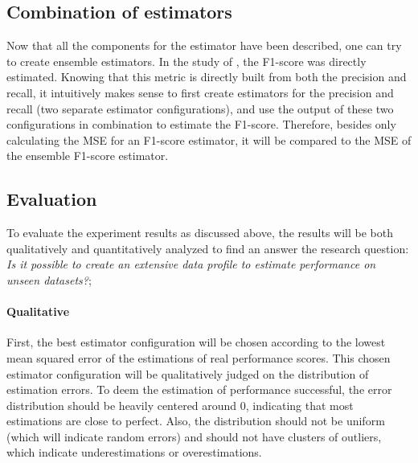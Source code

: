 \subsection{Combination of estimators}
Now that all the components for the estimator have been described, one can try to create ensemble estimators. In the study of \cite{Mahdavi2019-pk}, the F1-score was directly estimated. Knowing that this metric is directly built from both the precision and recall, it intuitively makes sense to first create estimators for the precision and recall (two separate estimator configurations), and use the output of these two configurations in combination to estimate the F1-score. Therefore, besides only calculating the MSE for an F1-score estimator, it will be compared to the MSE of the ensemble F1-score estimator.

\subsection{Evaluation}
\label{subsec:evaluation_performanceprediction}
To evaluate the experiment results as discussed above, the results will be both qualitatively and quantitatively analyzed to find an answer the research question: \textit{Is it possible to create an extensive data profile to estimate performance on unseen datasets?};

\paragraph{Qualitative} First, the best estimator configuration will be chosen according to the lowest mean squared error of the estimations of real performance scores. This chosen estimator configuration will be qualitatively judged on the distribution of estimation errors. To deem the estimation of performance successful, the error distribution should be heavily centered around 0, indicating that most estimations are close to perfect. Also, the distribution should not be uniform (which will indicate random errors) and should not have clusters of outliers, which indicate underestimations or overestimations. 

